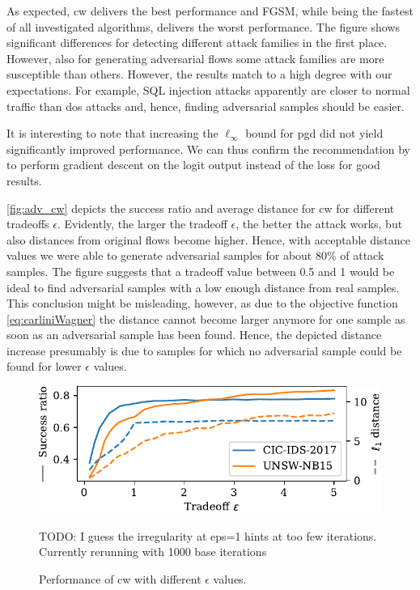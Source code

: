 \documentclass[conference]{IEEEtran}
\newcommand\note[2]{{\color{#1}#2}}
\newcommand\todo[1]{{\note{red}{TODO: #1}}}
\begin{document}
As expected, \gls{cw}  delivers the best performance and FGSM, while being the fastest of all investigated algorithms, delivers the worst performance.
The figure shows significant differences for detecting different attack families in the first place. However, also for generating adversarial flows some attack families are more susceptible than others. However, the results match to a high degree with our expectations. For example, SQL injection attacks apparently are closer to normal traffic than \gls{dos} attacks and, hence, finding adversarial samples should be easier.


It is interesting to note that increasing the $\ell_\infty$ bound for \gls{pgd} did not yield significantly improved performance. We can thus confirm the recommendation by \cite{carlini_towards_2017} to perform gradient descent on the logit output instead of the loss for good results.

\autoref{fig:adv_cw} depicts the success ratio and average distance for \gls{cw} for different tradeoffs $\epsilon$.
Evidently, the larger the tradeoff $\epsilon$, the better the attack works, but also distances from original flows become higher.
Hence, with acceptable distance values we were able to generate adversarial samples for about 80\% of attack samples.
The figure suggests that a tradeoff value between 0.5 and 1 would be ideal to find adversarial samples with a low enough distance from real samples.
This conclusion might be misleading, however, as due to the objective function \eqref{eq:carliniWagner} the distance cannot become larger anymore for one sample as soon as an adversarial sample has been found. %
Hence, the depicted distance increase presumably is due to samples for which no adversarial sample could be found for lower $\epsilon$ values.




\begin{figure}[b]
\includegraphics[width=\columnwidth]{../plots/adv_comparison/tradeoff.pdf}
\caption{Performance of \gls{cw} with different $\epsilon$ values.}
\todo{I guess the irregularity at eps=1 hints at too few iterations. Currently rerunning with 1000 base iterations}
\label{fig:adv_cw}
\end{figure}
\end{document}

